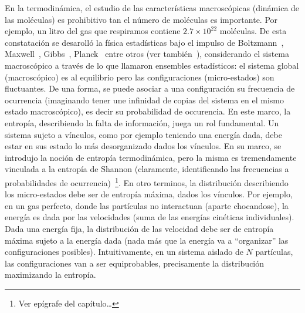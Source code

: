 \label{s:SZ:Desigualdades}




\label{sec:SZ:MaxEnt}

En  la  termodin\'amica, el  estudio  de  las caracter\'isticas  macrosc\'opicas
(din\'amica de las mol\'eculas) es prohibitivo tan el n\'umero de mol\'eculas es
importante. Por  ejemplo, un litro del  gas que respiramos  contiene $2.7 \times
10^{22}$  mol\'eculas.   De  esta  constataci\'on  se  desaroll\'o  la  f\'isica
estad\'isticas    bajo   el    impulso    de   Boltzmann~\cite{Bol96,    Bol98},
Maxwell~\cite{Max67},  Gibbs~\cite{Gib02}, Planck~\cite{Pla15} entre  otros (ver
tambi\'en~\cite{Jay65}), considerando el sistema macrosc\'opico a trav\'es de lo
que llamaron ensembles estad\'isticos:  el sistema global (macrosc\'opico) es al
equilibrio  pero las  configuraciones  (micro-estados) son  fluctuantes. De  una
forma,  se puede  asociar  a  una configuraci\'on  su  frecuencia de  ocurrencia
(imaginando  tener  une infinidad  de  copias del  sistema  en  el mismo  estado
macrosc\'opico),  es decir  su probabilidad  de occurencia.   En este  marco, la
entrop\'ia, describiendo  la falta de  informaci\'on, juega un  rol fundamental.
Un sistema  sujeto a v\'inculos, como  por ejemplo teniendo  una energ\'ia dada,
debe estar  en sus estado  lo m\'as desorganizado  dados los v\'inculos.   En su
marco, se introdujo la noci\'on  de entrop\'ia termodin\'amica, pero la misma es
tremendamente vinculada  a la  entrop\'ia de Shannon  (claramente, identificando
las  frecuencias a  probabilidades de  ocurrencia)~\footnote{Ver  ep\'igrafe del
  cap\'itulo\ldots}.   En  otro  terminos,  la distribuci\'on  describiendo  los
micro-estados  debe  ser de  entrop\'ia  m\'axima,  dados  los v\'inculos.   Por
ejemplo,  en un  gas perfecto,  donde  las part\'iculas  no interactuan  (aparte
chocandose), la  energ\'ia es dada por  las velocidades (suma  de las energ\'ias
cin\'eticas individuales).   Dada una energ\'ia  fija, la distribuci\'on  de las
velocidad debe ser de entrop\'ia m\'axima sujeto a la energ\'ia dada (nada m\'as
que   la   energ\'ia  va   a   ``organizar''   las  configuraciones   posibles).
Intuitivamente, en  un sistema aislado de $N$  part\'iculas, las configuraciones
van  a   ser  equiprobables,  precisamente  la   distribuci\'on  maximizando  la
entrop\'ia.   

